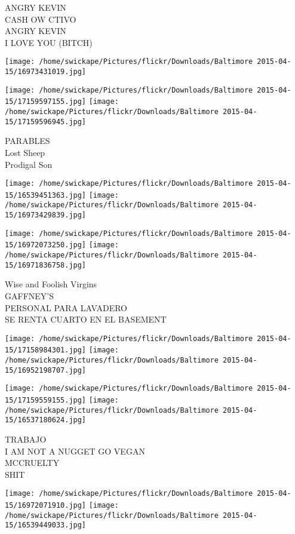 \documentclass[10pt,letterpaper]{article}
\begin{document}
ANGRY KEVIN\\
CASH OW CTIVO\\
ANGRY KEVIN\\
I LOVE YOU (BITCH)
\pagebreak

\texttt{[image: /home/swickape/Pictures/flickr/Downloads/Baltimore 2015-04-15/16973431019.jpg]}

\vspace{0.25in}
\texttt{[image: /home/swickape/Pictures/flickr/Downloads/Baltimore 2015-04-15/17159597155.jpg]}
\texttt{[image: /home/swickape/Pictures/flickr/Downloads/Baltimore 2015-04-15/17159596945.jpg]}

PARABLES\\
Lost Sheep\\
Prodigal Son
\pagebreak

\texttt{[image: /home/swickape/Pictures/flickr/Downloads/Baltimore 2015-04-15/16539451363.jpg]}
\texttt{[image: /home/swickape/Pictures/flickr/Downloads/Baltimore 2015-04-15/16973429839.jpg]}

\texttt{[image: /home/swickape/Pictures/flickr/Downloads/Baltimore 2015-04-15/16972073250.jpg]}
\texttt{[image: /home/swickape/Pictures/flickr/Downloads/Baltimore 2015-04-15/16971836758.jpg]}

Wise and Foolish Virgins\\
GAFFNEY'S\\
PERSONAL PARA LAVADERO\\
SE RENTA CUARTO EN EL BASEMENT
\pagebreak

\texttt{[image: /home/swickape/Pictures/flickr/Downloads/Baltimore 2015-04-15/17158984301.jpg]}
\texttt{[image: /home/swickape/Pictures/flickr/Downloads/Baltimore 2015-04-15/16952198707.jpg]}

\texttt{[image: /home/swickape/Pictures/flickr/Downloads/Baltimore 2015-04-15/17159559155.jpg]}
\texttt{[image: /home/swickape/Pictures/flickr/Downloads/Baltimore 2015-04-15/16537180624.jpg]}

TRABAJO\\
I AM NOT A NUGGET GO VEGAN\\
MCCRUELTY\\
SHIT
\pagebreak

\texttt{[image: /home/swickape/Pictures/flickr/Downloads/Baltimore 2015-04-15/16972071910.jpg]}
\texttt{[image: /home/swickape/Pictures/flickr/Downloads/Baltimore 2015-04-15/16539449033.jpg]}
\end{document}

